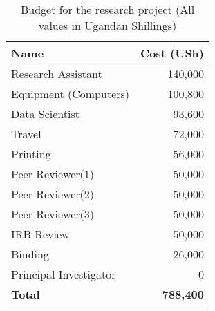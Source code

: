 \begin{table}[htbp]
    \centering
    \begin{tabular}{l r}
        \toprule
        \textbf{Name} & \textbf{Cost (USh)} \\
        \midrule
        Research Assistant & 140,000 \\
        Equipment (Computers) & 100,800 \\
        Data Scientist & 93,600 \\
        Travel & 72,000 \\
        Printing & 56,000 \\
        Peer Reviewer(1) & 50,000 \\
        Peer Reviewer(2) & 50,000 \\
        Peer Reviewer(3) & 50,000 \\
        IRB Review & 50,000 \\
        Binding & 26,000 \\
        Principal Investigator & 0 \\
        \midrule
        \textbf{Total} & \textbf{788,400} \\
        \bottomrule
    \end{tabular}
    \caption{Budget for the research project (All values in Ugandan Shillings)}
    \label{tab:budget}
\end{table}
